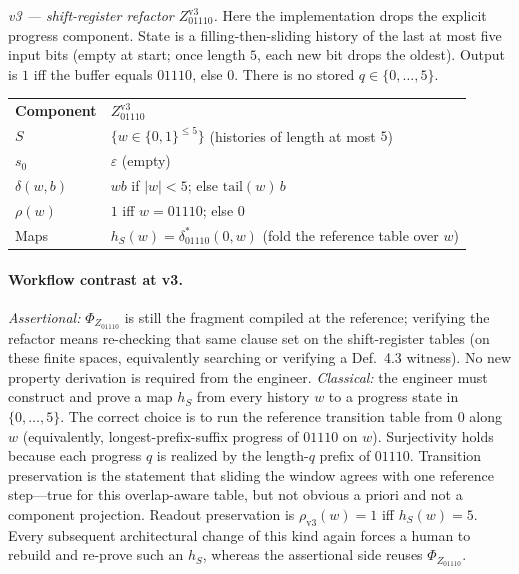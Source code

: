 \textit{v3 --- shift-register refactor $Z_{01110}^{\mathrm{v3}}$.}
Here the implementation drops the explicit progress component. State is a filling-then-sliding history of the last at most five input bits (empty at start; once length $5$, each new bit drops the oldest). Output is $1$ iff the buffer equals $01110$, else $0$. There is no stored $q\in\{0,\ldots,5\}$.

\begingroup
\renewcommand{\arraystretch}{1.2}
\footnotesize
\begin{center}
\begin{tabularx}{0.78\linewidth}{@{}>{\raggedright\arraybackslash}p{2.8cm}Y@{}}
    \headingfont\bfseries Component & \headingfont\bfseries $Z_{01110}^{\mathrm{v3}}$ \\
    \addlinespace[2pt]
    $S$ & $\{ w\in\{0,1\}^{\le 5}\}$ (histories of length at most $5$) \\
    \addlinespace[2pt]
    $s_0$ & $\varepsilon$ (empty) \\
    \addlinespace[2pt]
    $\delta(w,b)$ & $wb$ if $|w|<5$; else $\mathrm{tail}(w)\,b$ \\
    \addlinespace[2pt]
    $\rho(w)$ & $1$ iff $w=01110$; else $0$ \\
    \addlinespace[2pt]
    Maps & $h_S(w)=\delta^{*}_{01110}(0,w)$ (fold the reference table over $w$) \\
\end{tabularx}
\end{center}
\label{tab:z-pattern-cplx}
\endgroup
\vspace{4pt}

\paragraph{Workflow contrast at v3.}
\textit{Assertional:} $\Phi_{Z_{01110}}$ is still the fragment compiled at the reference; verifying the refactor means re-checking that same clause set on the shift-register tables (on these finite spaces, equivalently searching or verifying a Def.~4.3 witness). No new property derivation is required from the engineer.
\textit{Classical:} the engineer must construct and prove a map $h_S$ from every history $w$ to a progress state in $\{0,\ldots,5\}$. The correct choice is to run the reference transition table from $0$ along $w$ (equivalently, longest-prefix-suffix progress of $01110$ on $w$). Surjectivity holds because each progress $q$ is realized by the length-$q$ prefix of $01110$. Transition preservation is the statement that sliding the window agrees with one reference step---true for this overlap-aware table, but not obvious a priori and not a component projection. Readout preservation is $\rho_{\mathrm{v3}}(w)=1$ iff $h_S(w)=5$. Every subsequent architectural change of this kind again forces a human to rebuild and re-prove such an $h_S$, whereas the assertional side reuses $\Phi_{Z_{01110}}$.


